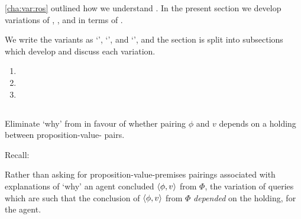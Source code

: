 \begin{note}
  \autoref{cha:var:ros} outlined how we understand .
  In the present section we develop variations of \qWhy{}, \qHow{}, and \issueInclusion{} in terms of \ros{}.

  We write the variants as `\qWhyV{}', `\qHowV{}', and `\issueConstraint{}', and the section is split into subsections which develop and discuss each variation.

  \begin{enumerate}[label=]
  \item
  \item
  \item
  \end{enumerate}

\end{note}

\subsection{\qWhyV{}}
\label{cha:var:sec:vars:qwhyvnp}

\begin{note}
  Eliminate `why' from \qWhy{} in favour of whether pairing \(\phi\) and \(v\) depends on a \ros{} holding between proposition-value-\pool{} pairs.

  Recall:
  \begin{quote}%
    \vspace{-1.5\baselineskip}%
    \questionWhyBasic*
  \end{quote}

  Rather than asking for proposition-value-premises pairings associated with explanations of `why' an agent concluded \(\langle \phi, v \rangle\) from \(\Phi\), the variation of \qWhy{} queries which  are such that the conclusion of \(\langle \phi, v \rangle\) from \(\Phi\) \emph{depended} on the  holding, for the agent.
  \end{note}

